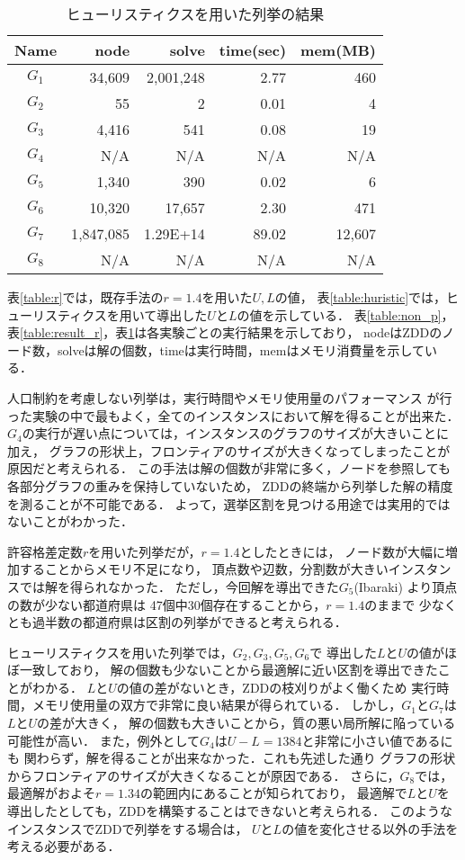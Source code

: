 \documentclass[10pt,a4paper,notitlepage,oneside,twocolumn]{abst_jsarticle}
\begin{document}
\begin{table}[htbp]
  \small
  \caption{ヒューリスティクスを用いた列挙の結果}
  \label{table:answer_h}
  \centering
  \begin{tabular}{c|rrrr}
    \hline
    Name &  node & solve & time(sec) & mem(MB) \\
    \hline \hline
    $G_1$ & 34{,}609 & 2{,}001{,}248 & 2.77 & 460 \\
    $G_2$ & 55 & 2 & 0.01 & 4 \\
    $G_3$ & 4{,}416 & 541 & 0.08 & 19 \\
    $G_4$ & N/A & N/A & N/A & N/A \\
    $G_5$ & 1{,}340 & 390 & 0.02 & 6 \\
    $G_6$ & 10{,}320 & 17{,}657 & 2.30 & 471 \\
    $G_7$ & 1{,}847{,}085 & 1.29E+14 & 89.02 & 12{,}607 \\
    $G_8$ & N/A & N/A & N/A & N/A \\
    \hline
  \end{tabular}
\end{table}

表\ref{table:r}では，既存手法の$r=1.4$を用いた$U, L$の値，
表\ref{table:huristic}では，ヒューリスティクスを用いて導出した$U$と$L$の値を示している．
表\ref{table:non_p}，表\ref{table:result_r}，表\ref{table:answer_h}は各実験ごとの実行結果を示しており，
nodeはZDDのノード数，solveは解の個数，timeは実行時間，memはメモリ消費量を示している．

人口制約を考慮しない列挙は，実行時間やメモリ使用量のパフォーマンス
が行った実験の中で最もよく，全てのインスタンスにおいて解を得ることが出来た．
$G_4$の実行が遅い点については，インスタンスのグラフのサイズが大きいことに加え，
グラフの形状上，フロンティアのサイズが大きくなってしまったことが原因だと考えられる．
この手法は解の個数が非常に多く，ノードを参照しても各部分グラフの重みを保持していないため，
ZDDの終端から列挙した解の精度を測ることが不可能である．
よって，選挙区割を見つける用途では実用的ではないことがわかった．

許容格差定数$r$を用いた列挙だが，$r=1.4$としたときには，
ノード数が大幅に増加することからメモリ不足になり，
頂点数や辺数，分割数が大きいインスタンスでは解を得られなかった．
ただし，今回解を導出できた$G_5$(Ibaraki) より頂点の数が少ない都道府県は
47個中30個存在することから，$r=1.4$のままで
少なくとも過半数の都道府県は区割の列挙ができると考えられる．

ヒューリスティクスを用いた列挙では，$G_2, G_3, G_5, G_6$で
導出した$L$と$U$の値がほぼ一致しており，
解の個数も少ないことから最適解に近い区割を導出できたことがわかる．
$L$と$U$の値の差がないとき，ZDDの枝刈りがよく働くため
実行時間，メモリ使用量の双方で非常に良い結果が得られている．
しかし，$G_1$と$G_7$は$L$と$U$の差が大きく，
解の個数も大きいことから，質の悪い局所解に陥っている可能性が高い．
また，例外として$G_4$は$U-L=1384$と非常に小さい値であるにも
関わらず，解を得ることが出来なかった．これも先述した通り
グラフの形状からフロンティアのサイズが大きくなることが原因である．
さらに，$G_8$では，最適解がおよそ$r=1.34$の範囲内にあることが知られており，
最適解で$L$と$U$を導出したとしても，ZDDを構築することはできないと考えられる．
このようなインスタンスでZDDで列挙をする場合は，
$U$と$L$の値を変化させる以外の手法を考える必要がある．
\end{document}
